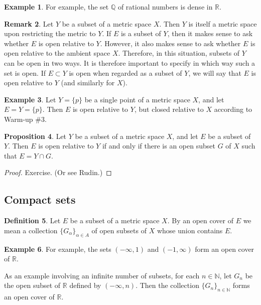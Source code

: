 \documentclass[12pt]{article}
\theoremstyle{definition}
\newtheorem{definition}{Definition}
\newtheorem{example}[definition]{Example}
\newtheorem{remark}[definition]{Remark}
\theoremstyle{theorem}
\newtheorem{proposition}[definition]{Proposition}
\begin{document}
\begin{example}
For example, the set $\mathbb{Q}$ of rational numbers is dense in $\mathbb{R}$. 
\end{example}

\begin{remark}
Let $Y$ be a subset of a metric space $X$. Then $Y$ is itself a metric space upon restricting the metric to $Y$. If $E$ is a subset of $Y$, then it makes sense to ask whether $E$ is open relative to $Y$. However, it also makes sense to ask whether $E$ is open relative to the ambient space $X$. Therefore, in this situation, subsets of $Y$ can be open in two ways. It is therefore important to specify in which way such a set is open. If $E \subset Y$ is open when regarded as a subset of $Y$, we will say that $E$ is open relative to $Y$ (and similarly for $X$).    
\end{remark}

\begin{example}
Let $Y = \{p\}$ be a single point of a metric space $X$, and let $E = Y = \{p\}$. Then $E$ is open relative to $Y$, but closed relative to $X$ according to Warm-up \#3.  
\end{example}

\begin{proposition}
Let $Y$ be a subset of a metric space $X$, and let $E$ be a subset of $Y$. Then $E$ is open relative to $Y$ if and only if there is an open subset $G$ of $X$ such that $E = Y \cap G$. 
\end{proposition}

\begin{proof}
Exercise. (Or see Rudin.)
\end{proof}



\subsection{Compact sets}

\begin{definition}
Let $E$ be a subset of a metric space $X$. By an open cover of $E$ we mean a collection $\{G_\alpha\}_{\alpha \in A}$ of open subsets of $X$ whose union contains $E$. 
\end{definition}

\begin{example}
For example, the sets $(-\infty, 1)$ and $(-1, \infty)$ form an open cover of $\mathbb{R}$. 

As an example involving an infinite number of subsets, for each $n \in \mathbb{N}$, let $G_n$ be the open subset of $\mathbb{R}$ defined by $(-\infty, n)$. Then the collection $\{G_n\}_{n \in \mathbb{N}}$ forms an open cover of $\mathbb{R}$.
\end{example}
\end{document}

